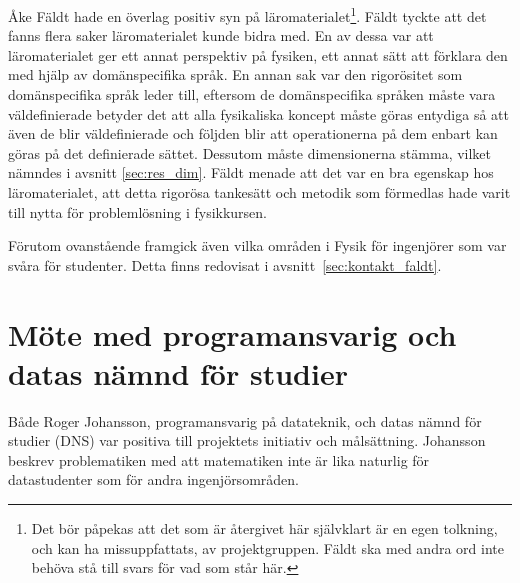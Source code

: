Åke Fäldt hade en överlag positiv syn på läromaterialet\footnote{Det bör
påpekas att det som är återgivet här självklart är en egen tolkning, och kan ha
missuppfattats, av projektgruppen. Fäldt ska med andra ord inte behöva stå till
svars för vad som står här.}. Fäldt tyckte att det fanns flera saker
läromaterialet kunde bidra med. En av dessa var att läromaterialet ger ett annat
perspektiv på fysiken, ett annat sätt att förklara den med
hjälp av domänspecifika språk. En annan sak var den rigorösitet som
domänspecifika språk leder till, eftersom de domänspecifika språken måste vara
väldefinierade betyder det att alla fysikaliska koncept måste göras entydiga så
att även de blir väldefinierade och följden blir att operationerna på dem
enbart kan göras på det definierade sättet. Dessutom måste dimensionerna stämma, vilket nämndes i avsnitt \ref{sec:res_dim}.
Fäldt menade att det var en bra egenskap hos läromaterialet, att detta rigorösa
tankesätt och metodik som förmedlas hade varit till nytta för problemlösning i
fysikkursen.

Förutom ovanstående framgick även vilka områden i Fysik för ingenjörer som var
svåra för studenter. Detta finns redovisat i avsnitt~\ref{sec:kontakt_faldt}.

\section{Möte med programansvarig och datas nämnd för studier}

Både Roger Johansson, programansvarig på datateknik, och datas nämnd för studier (DNS)
var positiva till projektets initiativ och målsättning. Johansson beskrev
problematiken med att matematiken inte är lika naturlig för datastudenter som för
andra ingenjörsområden.
